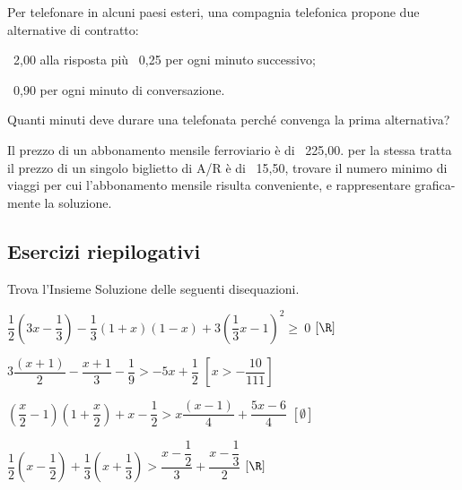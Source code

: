\begin{multicols}{2}
 \begin{esercizio}[]
 \label{ese:dis_}
 Per telefonare in alcuni paesi esteri, una compagnia telefonica
propone due alternative di contratto:
\begin{enumeratea}
 \item \officialeuro\ 2,00 alla risposta più \officialeuro\ 0,25 per ogni 
minuto successivo;
\item \officialeuro\ 0,90 per ogni minuto di conversazione.
\end{enumeratea}
Quanti minuti deve durare una telefonata perché convenga la prima
alternativa?
 \end{esercizio}

\begin{esercizio}[]
 \label{ese:dis_}
 Il prezzo di un abbonamento mensile ferroviario è di \officialeuro\ 225,00.
 per la stessa tratta il prezzo di un singolo biglietto di A/R è 
di \officialeuro\ 15,50, trovare il numero minimo di viaggi per
cui l'abbonamento mensile risulta conveniente, e
rappresentare grafica-mente la soluzione.
 \end{esercizio}


\end{multicols}

\subsection{Esercizi riepilogativi}

\begin{esercizio}[\Ast]
 \label{ese:21.15}
Trova l'Insieme Soluzione delle seguenti disequazioni.
 \begin{enumeratea}
\item
 \(\dfrac{1}{2}\left(3x-\dfrac{1}{3}\right)-\dfrac{1}{3}(1+x)(1-x)+
  3\left(\dfrac{1}{3}x-1\right)^{2}\ge~0\)
 \hfill \(\left[\R\right]\)
\item
 \(3\dfrac{(x+1)}{2}-\dfrac{x+1}{3}-\dfrac{1}{9}>-5x+\dfrac{1}{2}\)
 \hfill \(\left[x>-{\dfrac{10}{111}}\right]\)
\item
 \(\left(\dfrac{x}{2}-1\right)\left(1+\dfrac{x}{2}\right)+x-\dfrac{1}{2}>
  x\dfrac{(x-1)}{4}+\dfrac{5x-6}{4}\)
 \hfill \(\left[\emptyset\right]\)
\item
 \(\dfrac{1}{2}\left(x-\dfrac{1}{2}\right)+\dfrac{1}{3}\left(x+
  \dfrac{1}{3}\right)>\dfrac{x-\dfrac{1}{2}}{3}+\dfrac{x-\dfrac{1}{3}}{2}\)
 \hfill \(\left[\R\right]\)
\end{enumeratea}
\end{esercizio}


